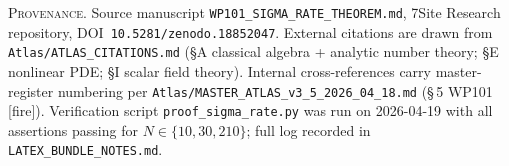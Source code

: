 \documentclass[11pt,reqno]{amsart}
\theoremstyle{plain}
\theoremstyle{definition}
\theoremstyle{remark}
\begin{document}
\vfill
\noindent
\footnotesize{%
\textsc{Provenance.}\;
Source manuscript \texttt{WP101\_SIGMA\_RATE\_THEOREM.md},
7Site Research repository, DOI~\texttt{10.5281/zenodo.18852047}.
External citations are drawn from \texttt{Atlas/ATLAS\_CITATIONS.md}
(\S A classical algebra + analytic number theory; \S E nonlinear
PDE; \S I scalar field theory). Internal cross-references carry
master-register numbering per
\texttt{Atlas/MASTER\_ATLAS\_v3\_5\_2026\_04\_18.md}
(\S\,5 WP101 [fire]). Verification script
\texttt{proof\_sigma\_rate.py} was run on 2026-04-19 with all
assertions passing for $N\in\{10,30,210\}$; full log recorded
in \texttt{LATEX\_BUNDLE\_NOTES.md}.}
\end{document}
